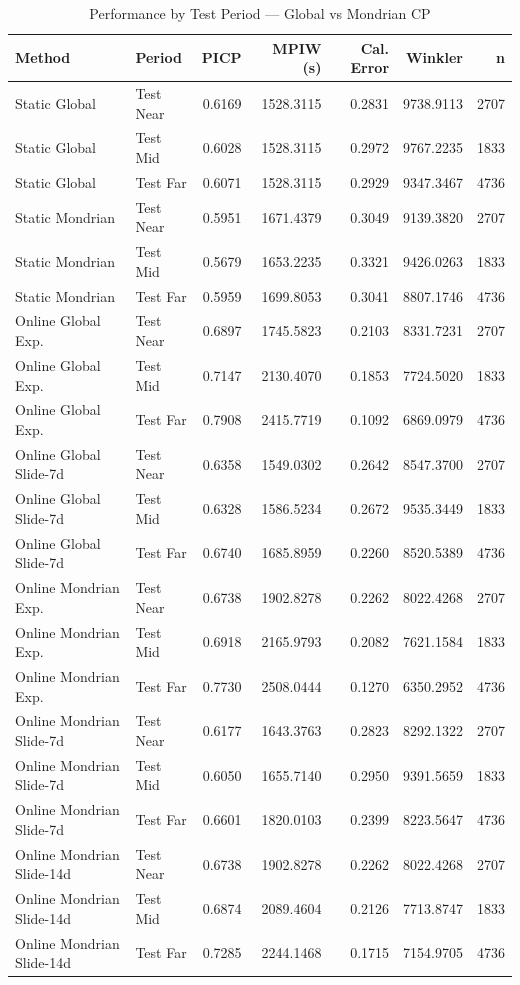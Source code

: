 \begin{table}
\caption{Performance by Test Period — Global vs Mondrian CP}
\label{tab:t5c_2_by_period}
\begin{tabular}{llrrrrr}
\toprule
Method & Period & PICP & MPIW (s) & Cal. Error & Winkler & n \\
\midrule
Static Global & Test Near & 0.6169 & 1528.3115 & 0.2831 & 9738.9113 & 2707 \\
Static Global & Test Mid & 0.6028 & 1528.3115 & 0.2972 & 9767.2235 & 1833 \\
Static Global & Test Far & 0.6071 & 1528.3115 & 0.2929 & 9347.3467 & 4736 \\
Static Mondrian & Test Near & 0.5951 & 1671.4379 & 0.3049 & 9139.3820 & 2707 \\
Static Mondrian & Test Mid & 0.5679 & 1653.2235 & 0.3321 & 9426.0263 & 1833 \\
Static Mondrian & Test Far & 0.5959 & 1699.8053 & 0.3041 & 8807.1746 & 4736 \\
Online Global Exp. & Test Near & 0.6897 & 1745.5823 & 0.2103 & 8331.7231 & 2707 \\
Online Global Exp. & Test Mid & 0.7147 & 2130.4070 & 0.1853 & 7724.5020 & 1833 \\
Online Global Exp. & Test Far & 0.7908 & 2415.7719 & 0.1092 & 6869.0979 & 4736 \\
Online Global Slide-7d & Test Near & 0.6358 & 1549.0302 & 0.2642 & 8547.3700 & 2707 \\
Online Global Slide-7d & Test Mid & 0.6328 & 1586.5234 & 0.2672 & 9535.3449 & 1833 \\
Online Global Slide-7d & Test Far & 0.6740 & 1685.8959 & 0.2260 & 8520.5389 & 4736 \\
Online Mondrian Exp. & Test Near & 0.6738 & 1902.8278 & 0.2262 & 8022.4268 & 2707 \\
Online Mondrian Exp. & Test Mid & 0.6918 & 2165.9793 & 0.2082 & 7621.1584 & 1833 \\
Online Mondrian Exp. & Test Far & 0.7730 & 2508.0444 & 0.1270 & 6350.2952 & 4736 \\
Online Mondrian Slide-7d & Test Near & 0.6177 & 1643.3763 & 0.2823 & 8292.1322 & 2707 \\
Online Mondrian Slide-7d & Test Mid & 0.6050 & 1655.7140 & 0.2950 & 9391.5659 & 1833 \\
Online Mondrian Slide-7d & Test Far & 0.6601 & 1820.0103 & 0.2399 & 8223.5647 & 4736 \\
Online Mondrian Slide-14d & Test Near & 0.6738 & 1902.8278 & 0.2262 & 8022.4268 & 2707 \\
Online Mondrian Slide-14d & Test Mid & 0.6874 & 2089.4604 & 0.2126 & 7713.8747 & 1833 \\
Online Mondrian Slide-14d & Test Far & 0.7285 & 2244.1468 & 0.1715 & 7154.9705 & 4736 \\
\bottomrule
\end{tabular}
\end{table}
